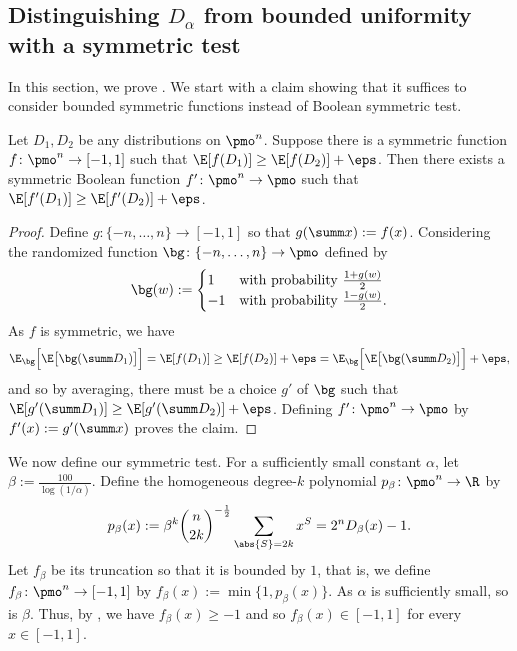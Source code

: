 \subsection{Distinguishing $D_\alpha$ from bounded uniformity with a symmetric test}

In this section, we prove .
We start with a claim showing that it suffices to consider bounded symmetric functions instead of Boolean symmetric test.

\begin{claim}
    Let $D_1, D_2$ be any distributions on $\pmo^n$.
    Suppose there is a symmetric function $f\colon\pmo^n \to [-1,1]$ such that $\E[f(D_1)] \ge \E[f(D_2)] + \eps$.
    Then there exists a symmetric Boolean function $f'\colon \pmo^n \to \pmo$ such that $\E[f'(D_1)] \ge \E[f'(D_2)] + \eps$.
\end{claim}

\begin{proof}
Define $g\colon \{-n, \ldots, n\} \to [-1,1]$ so that $g(\summ x) := f(x)$.
Considering the randomized function $\bg\colon\{-n, \ldots, n\} \to \pmo$ defined by
\[
    \bg(w) := \begin{cases} 1 & \text{with probability $\frac{1 + g(w)}{2}$} \\
    -1 & \text{with probability $\frac{1 - g(w)}{2}$.} \end{cases}
\]
As $f$ is symmetric, we have
\[
    \E_{\bg}\Bigl[ \E\bigl[\bg(\summ D_1) \bigr] \Bigr]
    = \E[f(D_1)]
    \ge \E[f(D_2)] + \eps
    = \E_{\bg}\Bigl[ \E\bigl[\bg(\summ D_2) \bigr]\Bigr] + \eps ,
\]
and so by averaging, there must be a choice $g'$ of $\bg$ such that $\E[g'(\summ D_1)] \ge \E[g'(\summ D_2)] + \eps$.
Defining $f'\colon \pmo^n \to \pmo$ by $f'(x) := g'(\summ x)$ proves the claim.
\end{proof}


We now define our symmetric test.
For a sufficiently small constant $\alpha$, let $\beta := \frac{100}{\log(1/\alpha)}$.
Define the homogeneous degree-$k$ polynomial $p_\beta \colon\pmo^n \to \R$ by
  \[
    p_\beta(x) := \beta^k \binom{n}{2k}^{-\frac{1}{2}} \sum_{\abs{S}=2k} x^S = 2^n D_\beta(x) - 1.
  \]
  Let $f_\beta$ be its truncation so that it is bounded by $1$, that is, we define $f_\beta\colon\pmo^n \to [-1,1]$ by $f_\beta(x) := \min\{1, p_\beta(x)\}$.
  As $\alpha$ is sufficiently small, so is $\beta$.
  Thus, by , we have $f_\beta(x) \ge -1$ and so $f_\beta(x) \in [-1,1]$ for every $x \in [-1,1]$.

